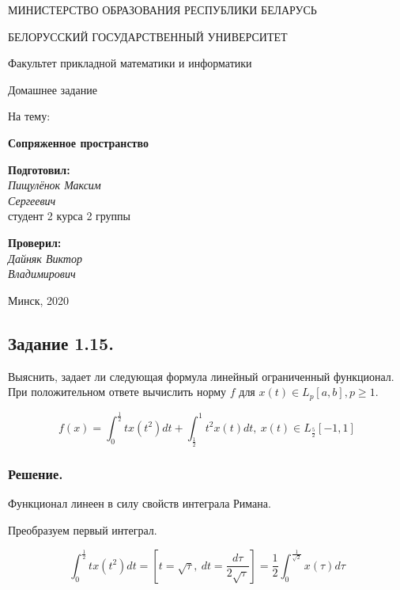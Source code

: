 \documentclass[a4paper, 12pt]{report}
\begin{document}
\begin{titlepage}
    
    \bigskip
    \centerline{\large МИНИСТЕРСТВО ОБРАЗОВАНИЯ РЕСПУБЛИКИ БЕЛАРУСЬ}
    \bigskip
    \centerline{\large БЕЛОРУССКИЙ ГОСУДАРСТВЕННЫЙ УНИВЕРСИТЕТ}
    \bigskip
    \centerline{\large Факультет прикладной математики и информатики}
    \vfill
    \vfill
    \vfill
    \centerline{\LARGE Домашнее задание}
    \bigskip
    \bigskip
    \centerline{\large На тему:}
    \centerline{\large \bf \sc Сопряженное пространство}
    \bigskip
    \vfill
    \vfill
    \hfill
    \begin{minipage}{0.3\textwidth}
        {\large{\bf Подготовил:} \\
        {\it Пищулёнок Максим \\ Сергеевич}\\
        {студент 2 курса 2 группы}}
    \end{minipage}
    \vfill
    \hfill
    \begin{minipage}{0.3\textwidth}
      {\large{\bf Проверил:} \\
    {\it Дайняк Виктор \\ Владимирович}}
    \end{minipage}
    \vfill
    \vfill
    \centerline{\large Минск, 2020}
\end{titlepage}
  
\newpage
\subsection*{Задание 1.15.} 

Выяснить, задает ли следующая формула линейный ограниченный функционал. При 
положительном ответе вычислить норму $f$ для $x(t) \in L_p [a, b], p \ge 1$.

\[f(x) = \int_{0}^{\frac{1}{2}} tx (t^2) dt +
 \int_{\frac{1}{2}}^{1} t^2 x(t) dt,\ x(t) \in L_{\frac{5}{2}} [ - 1, 1]\]

 \subsubsection*{Решение.}

 Функционал линеен в силу свойств интеграла Римана. 

 Преобразуем первый интеграл.

  \[\int_{0}^{\frac{1}{2}} tx(t^2)dt = 
  \left[ t = \sqrt{\tau},\ dt = \frac{d\tau}{2 \sqrt{\tau}} \right] = 
  \frac{1}{2} \int_{0}^{\frac{1}{\sqrt{2}}} x(\tau) d \tau\]
\end{document}
